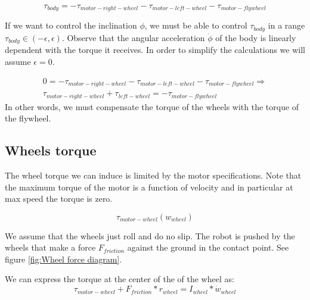 \[\tau_{body} = -\tau_{motor-right-wheel} -\tau_{motor-left-wheel} -\tau_{motor-flywheel} \]

If we want to control the inclination $\phi$, we must be able to control $\tau_{body}$ in a range $\tau_{body} \in (-\epsilon, \epsilon)$. Observe that the angular acceleration $\ddot{\phi}$ of the body is linearly dependent with the torque it receives. In order to simplify the calculations we will assume $\epsilon = 0$.

\begin{equation} \label{eq:control equation}
\begin{split}
0 = -\tau_{motor-right-wheel} -\tau_{motor-left-wheel} -\tau_{motor-flywheel} \Rightarrow \\
\tau_{motor-right-wheel} +\tau_{left-wheel} = -\tau_{motor-flywheel}
\end{split}
\end{equation}
In other words, we must compensate the torque of the wheels with the torque of the flywheel.

\subsection{Wheels torque}
The wheel torque we can induce is limited by the motor specifications. Note that the maximum torque of the motor is a function of velocity and in particular at max speed the torque is zero.

\[\tau_{motor-wheel} (w_{wheel}) \]

We assume that the wheels just roll and do no slip.
The robot is pushed by the wheels that make a force $F_{friction}$ against the ground in the contact point. See figure \ref{fig:Wheel force diagram}.

We can express the torque at the center of the of the wheel as:
\[\tau_{motor-wheel} + F_{friction} * r_{wheel} = I_{wheel} * \dot{w}_{wheel} \]

